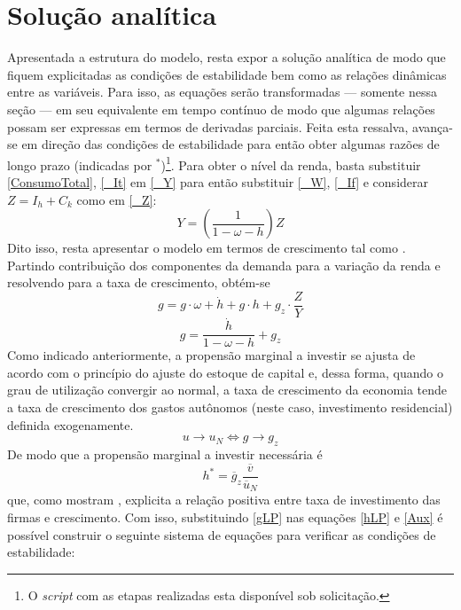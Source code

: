 \section{Solução analítica}
\label{SecAnalitica}

Apresentada a estrutura do modelo, resta expor a solução analítica de modo que fiquem explicitadas as condições de estabilidade bem como as relações dinâmicas entre as variáveis. 
Para isso, as equações serão transformadas --- somente nessa seção --- em seu equivalente em tempo contínuo de modo que algumas relações possam ser expressas em termos de derivadas parciais.
Feita esta ressalva, avança-se em direção das condições de estabilidade para então obter algumas razões de longo prazo (indicadas por $^*$)\footnote{O \textit{script} com as etapas realizadas esta disponível sob solicitação.}.
Para obter o nível da renda, basta substituir \ref{ConsumoTotal}, \ref{_It} em \ref{_Y} para então substituir \ref{_W}, \ref{_If} e considerar $Z = I_h + C_k$ como em \ref{_Z}:
\begin{equation}
    \label{AnaliticaNivel}
    Y = \left(\frac{1}{1-\omega - h}\right)Z
\end{equation}
Dito isso, resta apresentar o modelo em termos de crescimento tal como \textcite{freitas_growth_2015}. Partindo contribuição dos componentes da demanda para a variação da renda e resolvendo para a taxa de crescimento, obtém-se
$$
g = g\cdot \omega + \dot h + g\cdot h + g_z\cdot \frac{Z}{Y}
$$
\begin{equation}
\label{gLP}
    g = \frac{\dot h}{1 - \omega - h} + g_z
\end{equation}
Como indicado anteriormente, a propensão marginal a investir se ajusta de acordo com o princípio do ajuste do estoque de capital e, dessa forma, quando o grau de utilização convergir ao normal, a taxa de crescimento da economia tende a taxa de crescimento dos gastos autônomos (neste caso, investimento residencial) definida exogenamente. 
\begin{equation}
u \to u_N \Leftrightarrow g \to g_z
\end{equation}
De modo que a propensão marginal a investir necessária é
\begin{equation}
\label{hLP}
h^* = \overline g_z\frac{\overline v}{\overline u_N}
\end{equation}
que, como mostram \textcite{fagundes_role_2017}, explicita a relação positiva entre taxa de investimento das firmas e crescimento. Com isso, substituindo \ref{gLP} nas equações \ref{hLP} e \ref{Aux} é possível construir o seguinte sistema de equações para verificar as condições de estabilidade:

